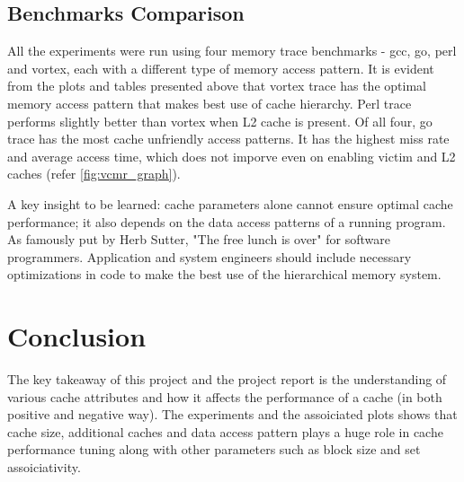 \documentclass[a4paper]{article}
\begin{document}
\subsection{Benchmarks Comparison}
All the experiments were run using four memory trace benchmarks - gcc, go, perl and vortex, each with a different type of memory access pattern. It is evident from the plots and tables presented above that vortex trace has the optimal memory access pattern that makes best use of cache hierarchy. Perl trace performs slightly better than vortex when L2 cache is present. Of all four, go trace has the most cache unfriendly access patterns. It has the highest miss rate and average access time, which does not imporve even on enabling victim and L2 caches (refer \ref{fig:vcmr_graph}).

A key insight to be learned: cache parameters alone cannot ensure optimal cache performance; it also depends on the data access patterns of a running program. As famously put by Herb Sutter, "The free lunch is over" for software programmers. Application and system engineers should include necessary optimizations in code to make the best use of the hierarchical memory system.

\section{Conclusion}
The key takeaway of this project and the project report is the understanding of various cache attributes and how it affects the performance of a cache (in both positive and negative way). The experiments and the assoiciated plots shows that cache size, additional caches and data access pattern plays a huge role in cache performance tuning along with other parameters such as block size and set assoiciativity. 
\end{document}
